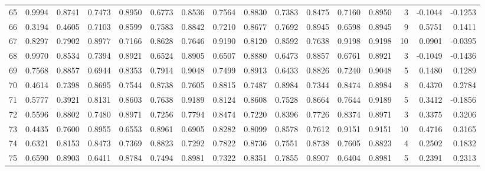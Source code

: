 \begin{tabular}{lrrrrrrrrrrrrrrr}
65  &      0.9994 &  0.8741 &  0.7473 &  0.8950 &  0.6773 &  0.8536 &  0.7564 &  0.8830 &  0.7383 &  0.8475 &   0.7160 &     0.8950 &      3 &                   -0.1044 &                    -0.1253 \\
66  &      0.3194 &  0.4605 &  0.7103 &  0.8599 &  0.7583 &  0.8842 &  0.7210 &  0.8677 &  0.7692 &  0.8945 &   0.6598 &     0.8945 &      9 &                    0.5751 &                     0.1411 \\
67  &      0.8297 &  0.7902 &  0.8977 &  0.7166 &  0.8628 &  0.7646 &  0.9190 &  0.8120 &  0.8592 &  0.7638 &   0.9198 &     0.9198 &     10 &                    0.0901 &                    -0.0395 \\
68  &      0.9970 &  0.8534 &  0.7394 &  0.8921 &  0.6524 &  0.8905 &  0.6507 &  0.8880 &  0.6473 &  0.8857 &   0.6761 &     0.8921 &      3 &                   -0.1049 &                    -0.1436 \\
69  &      0.7568 &  0.8857 &  0.6944 &  0.8353 &  0.7914 &  0.9048 &  0.7499 &  0.8913 &  0.6433 &  0.8826 &   0.7240 &     0.9048 &      5 &                    0.1480 &                     0.1289 \\
70  &      0.4614 &  0.7398 &  0.8695 &  0.7544 &  0.8738 &  0.7605 &  0.8815 &  0.7487 &  0.8984 &  0.7344 &   0.8474 &     0.8984 &      8 &                    0.4370 &                     0.2784 \\
71  &      0.5777 &  0.3921 &  0.8131 &  0.8603 &  0.7638 &  0.9189 &  0.8124 &  0.8608 &  0.7528 &  0.8664 &   0.7644 &     0.9189 &      5 &                    0.3412 &                    -0.1856 \\
72  &      0.5596 &  0.8802 &  0.7480 &  0.8971 &  0.7256 &  0.7794 &  0.8474 &  0.7220 &  0.8396 &  0.7726 &   0.8374 &     0.8971 &      3 &                    0.3375 &                     0.3206 \\
73  &      0.4435 &  0.7600 &  0.8955 &  0.6553 &  0.8961 &  0.6905 &  0.8282 &  0.8099 &  0.8578 &  0.7612 &   0.9151 &     0.9151 &     10 &                    0.4716 &                     0.3165 \\
74  &      0.6321 &  0.8153 &  0.8473 &  0.7369 &  0.8823 &  0.7292 &  0.7822 &  0.8736 &  0.7551 &  0.8738 &   0.7605 &     0.8823 &      4 &                    0.2502 &                     0.1832 \\
75  &      0.6590 &  0.8903 &  0.6411 &  0.8784 &  0.7494 &  0.8981 &  0.7322 &  0.8351 &  0.7855 &  0.8907 &   0.6404 &     0.8981 &      5 &                    0.2391 &                     0.2313 \\

\end{tabular}

